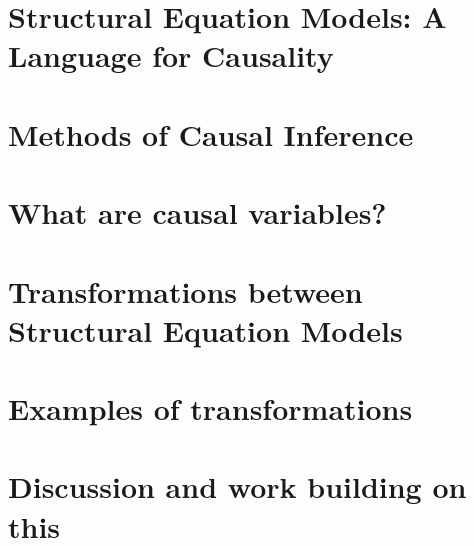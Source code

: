 

\section{Structural Equation Models: A Language for Causality}
\section{Methods of Causal Inference}
\section{What are causal variables?}
\section{Transformations between Structural Equation Models}
\section{Examples of transformations}
\section{Discussion and work building on this}
